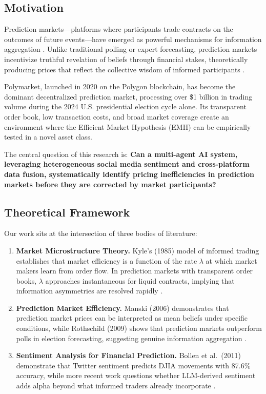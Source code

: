 \documentclass[12pt, letterpaper]{article}
\begin{document}
\subsection{Motivation}

Prediction markets---platforms where participants trade contracts on the outcomes of future events---have emerged as powerful mechanisms for information aggregation \citep{arrow2008promise}. Unlike traditional polling or expert forecasting, prediction markets incentivize truthful revelation of beliefs through financial stakes, theoretically producing prices that reflect the collective wisdom of informed participants \citep{wolfers2004prediction}.

Polymarket, launched in 2020 on the Polygon blockchain, has become the dominant decentralized prediction market, processing over \$1 billion in trading volume during the 2024 U.S. presidential election cycle alone. Its transparent order book, low transaction costs, and broad market coverage create an environment where the Efficient Market Hypothesis (EMH) can be empirically tested in a novel asset class.

The central question of this research is: \textbf{Can a multi-agent AI system, leveraging heterogeneous social media sentiment and cross-platform data fusion, systematically identify pricing inefficiencies in prediction markets before they are corrected by market participants?}

\subsection{Theoretical Framework}

Our work sits at the intersection of three bodies of literature:

\begin{enumerate}[label=(\roman*)]
    \item \textbf{Market Microstructure Theory.} Kyle's (1985) model of informed trading establishes that market efficiency is a function of the rate $\lambda$ at which market makers learn from order flow. In prediction markets with transparent order books, $\lambda$ approaches instantaneous for liquid contracts, implying that information asymmetries are resolved rapidly \citep{kyle1985continuous}.

    \item \textbf{Prediction Market Efficiency.} Manski (2006) demonstrates that prediction market prices can be interpreted as mean beliefs under specific conditions, while Rothschild (2009) shows that prediction markets outperform polls in election forecasting, suggesting genuine information aggregation \citep{manski2006interpreting}.

    \item \textbf{Sentiment Analysis for Financial Prediction.} Bollen et al.\ (2011) demonstrate that Twitter sentiment predicts DJIA movements with 87.6\% accuracy, while more recent work questions whether LLM-derived sentiment adds alpha beyond what informed traders already incorporate \citep{bollen2011twitter}.
\end{enumerate}
\end{document}
